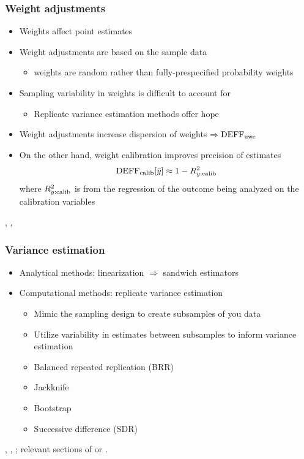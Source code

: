 \documentclass{beamer}
\begin{document}
\begin{frame}\frametitle{Weight adjustments}

\begin{itemize}
    \item Weights affect point estimates
    \item Weight adjustments are based on the sample data
        \begin{itemize} \item weights are random rather than fully-prespecified probability weights \end{itemize}
    \item Sampling variability in weights is difficult to account for
        \begin{itemize}
            \item Replicate variance estimation methods offer hope
        \end{itemize}
    \item Weight adjustments increase dispersion of weights $\Rightarrow {\rm DEFF}_{\rm uwe}$
    \item On the other hand, weight calibration improves precision of estimates
            $$
            {\rm DEFF}_{\rm calib} [\bar y] \approx 1 - R^2_{y:{\rm calib}}
            $$
            where $R^2_{y:{\rm calib}}$ is from the regression of the outcome being analyzed on the calibration variables
\end{itemize}

\medskip

\citet{deville:sarndal:1992},
\citet{henry:valliant:2015},
\citet{devaud:tille:2019}

\end{frame}

\begin{frame}\frametitle{Variance estimation}

\begin{itemize}
    \item Analytical methods: linearization $\Rightarrow$ sandwich estimators
    \item Computational methods: replicate variance estimation
    \begin{itemize}
        \item Mimic the sampling design to create subsamples of you data
        \item Utilize variability in estimates between subsamples to inform variance estimation
        \item Balanced repeated replication (BRR)
        \item Jackknife
        \item Bootstrap
        \item Successive difference (SDR)
    \end{itemize}
\end{itemize}

\bigskip

\citet{shao:1996}, \citet{rust:rao:1996}, \citet{kolenikov:2010}; 
relevant sections of \citet{heeringa:west:berglund:2017} or \citet{lumley:2010}.

\end{frame}
\end{document}
